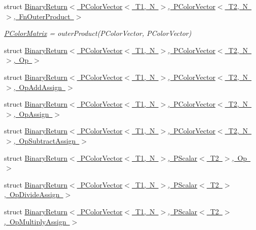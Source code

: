 \begin{DoxyCompactItemize}
\item 
struct \mbox{\hyperlink{structENSEM_1_1BinaryReturn_3_01PColorVector_3_01T1_00_01N_01_4_00_01PColorVector_3_01T2_00_01N_01_4_00_01FnOuterProduct_01_4}{Binary\+Return$<$ P\+Color\+Vector$<$ T1, N $>$, P\+Color\+Vector$<$ T2, N $>$, Fn\+Outer\+Product $>$}}
\begin{DoxyCompactList}\small\item\em \mbox{\hyperlink{classENSEM_1_1PColorMatrix}{P\+Color\+Matrix}} = outer\+Product(\+P\+Color\+Vector, P\+Color\+Vector) \end{DoxyCompactList}\item 
struct \mbox{\hyperlink{structENSEM_1_1BinaryReturn_3_01PColorVector_3_01T1_00_01N_01_4_00_01PColorVector_3_01T2_00_01N_01_4_00_01Op_01_4}{Binary\+Return$<$ P\+Color\+Vector$<$ T1, N $>$, P\+Color\+Vector$<$ T2, N $>$, Op $>$}}
\item 
struct \mbox{\hyperlink{structENSEM_1_1BinaryReturn_3_01PColorVector_3_01T1_00_01N_01_4_00_01PColorVector_3_01T2_00_01N_01_4_00_01OpAddAssign_01_4}{Binary\+Return$<$ P\+Color\+Vector$<$ T1, N $>$, P\+Color\+Vector$<$ T2, N $>$, Op\+Add\+Assign $>$}}
\item 
struct \mbox{\hyperlink{structENSEM_1_1BinaryReturn_3_01PColorVector_3_01T1_00_01N_01_4_00_01PColorVector_3_01T2_00_01N_01_4_00_01OpAssign_01_4}{Binary\+Return$<$ P\+Color\+Vector$<$ T1, N $>$, P\+Color\+Vector$<$ T2, N $>$, Op\+Assign $>$}}
\item 
struct \mbox{\hyperlink{structENSEM_1_1BinaryReturn_3_01PColorVector_3_01T1_00_01N_01_4_00_01PColorVector_3_01T2_00_01N_01_4_00_01OpSubtractAssign_01_4}{Binary\+Return$<$ P\+Color\+Vector$<$ T1, N $>$, P\+Color\+Vector$<$ T2, N $>$, Op\+Subtract\+Assign $>$}}
\item 
struct \mbox{\hyperlink{structENSEM_1_1BinaryReturn_3_01PColorVector_3_01T1_00_01N_01_4_00_01PScalar_3_01T2_01_4_00_01Op_01_4}{Binary\+Return$<$ P\+Color\+Vector$<$ T1, N $>$, P\+Scalar$<$ T2 $>$, Op $>$}}
\item 
struct \mbox{\hyperlink{structENSEM_1_1BinaryReturn_3_01PColorVector_3_01T1_00_01N_01_4_00_01PScalar_3_01T2_01_4_00_01OpDivideAssign_01_4}{Binary\+Return$<$ P\+Color\+Vector$<$ T1, N $>$, P\+Scalar$<$ T2 $>$, Op\+Divide\+Assign $>$}}
\item 
struct \mbox{\hyperlink{structENSEM_1_1BinaryReturn_3_01PColorVector_3_01T1_00_01N_01_4_00_01PScalar_3_01T2_01_4_00_01OpMultiplyAssign_01_4}{Binary\+Return$<$ P\+Color\+Vector$<$ T1, N $>$, P\+Scalar$<$ T2 $>$, Op\+Multiply\+Assign $>$}}
\item 

\end{DoxyCompactItemize}
